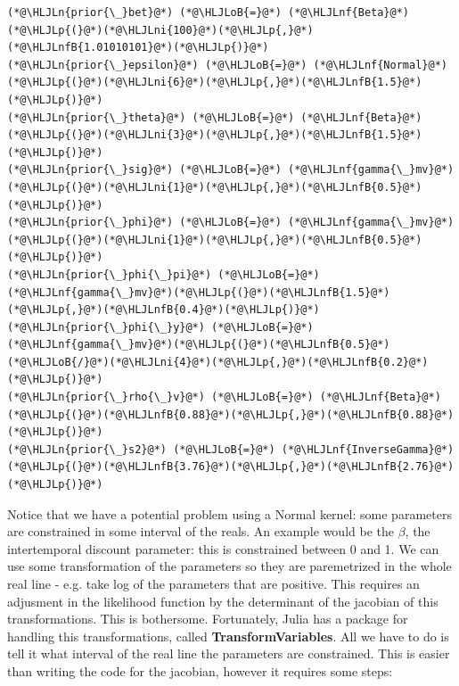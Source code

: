 \documentclass[12pt,a4paper]{article}
\newcommand{\HLJLn}[1]{#1}
\newcommand{\HLJLnf}[1]{\textcolor[RGB]{66,102,213}{#1}}
\newcommand{\HLJLnfB}[1]{\textcolor[RGB]{59,151,46}{#1}}
\newcommand{\HLJLni}[1]{\textcolor[RGB]{59,151,46}{#1}}
\newcommand{\HLJLoB}[1]{\textcolor[RGB]{102,102,102}{\textbf{#1}}}
\newcommand{\HLJLp}[1]{#1}
\begin{document}
\begin{lstlisting}
(*@\HLJLn{prior{\_}bet}@*) (*@\HLJLoB{=}@*) (*@\HLJLnf{Beta}@*)(*@\HLJLp{(}@*)(*@\HLJLni{100}@*)(*@\HLJLp{,}@*)(*@\HLJLnfB{1.01010101}@*)(*@\HLJLp{)}@*)
(*@\HLJLn{prior{\_}epsilon}@*) (*@\HLJLoB{=}@*) (*@\HLJLnf{Normal}@*)(*@\HLJLp{(}@*)(*@\HLJLni{6}@*)(*@\HLJLp{,}@*)(*@\HLJLnfB{1.5}@*)(*@\HLJLp{)}@*)
(*@\HLJLn{prior{\_}theta}@*) (*@\HLJLoB{=}@*) (*@\HLJLnf{Beta}@*)(*@\HLJLp{(}@*)(*@\HLJLni{3}@*)(*@\HLJLp{,}@*)(*@\HLJLnfB{1.5}@*)(*@\HLJLp{)}@*)
(*@\HLJLn{prior{\_}sig}@*) (*@\HLJLoB{=}@*) (*@\HLJLnf{gamma{\_}mv}@*)(*@\HLJLp{(}@*)(*@\HLJLni{1}@*)(*@\HLJLp{,}@*)(*@\HLJLnfB{0.5}@*)(*@\HLJLp{)}@*)
(*@\HLJLn{prior{\_}phi}@*) (*@\HLJLoB{=}@*) (*@\HLJLnf{gamma{\_}mv}@*)(*@\HLJLp{(}@*)(*@\HLJLni{1}@*)(*@\HLJLp{,}@*)(*@\HLJLnfB{0.5}@*)(*@\HLJLp{)}@*)
(*@\HLJLn{prior{\_}phi{\_}pi}@*) (*@\HLJLoB{=}@*) (*@\HLJLnf{gamma{\_}mv}@*)(*@\HLJLp{(}@*)(*@\HLJLnfB{1.5}@*)(*@\HLJLp{,}@*)(*@\HLJLnfB{0.4}@*)(*@\HLJLp{)}@*)
(*@\HLJLn{prior{\_}phi{\_}y}@*) (*@\HLJLoB{=}@*) (*@\HLJLnf{gamma{\_}mv}@*)(*@\HLJLp{(}@*)(*@\HLJLnfB{0.5}@*)(*@\HLJLoB{/}@*)(*@\HLJLni{4}@*)(*@\HLJLp{,}@*)(*@\HLJLnfB{0.2}@*)(*@\HLJLp{)}@*)
(*@\HLJLn{prior{\_}rho{\_}v}@*) (*@\HLJLoB{=}@*) (*@\HLJLnf{Beta}@*)(*@\HLJLp{(}@*)(*@\HLJLnfB{0.88}@*)(*@\HLJLp{,}@*)(*@\HLJLnfB{0.88}@*)(*@\HLJLp{)}@*)
(*@\HLJLn{prior{\_}s2}@*) (*@\HLJLoB{=}@*) (*@\HLJLnf{InverseGamma}@*)(*@\HLJLp{(}@*)(*@\HLJLnfB{3.76}@*)(*@\HLJLp{,}@*)(*@\HLJLnfB{2.76}@*)(*@\HLJLp{)}@*)
\end{lstlisting}


Notice that we have a potential problem using a Normal kernel: some parameters are constrained in some interval of the reals. An example would be the $\beta$, the intertemporal discount parameter: this is constrained between 0 and 1. We can use some transformation of the parameters so they are paremetrized in the whole real line - e.g. take log of the parameters that are positive. This requires an adjusment in the likelihood function by the determinant of the jacobian of this transformations. This is bothersome. Fortunately, Julia has a package for handling this transformations, called \textbf{TransformVariables}. All we have to do is tell it what interval of the real line the parameters are constrained. This is easier than writing the code for the jacobian, however it requires some steps:
\end{document}
